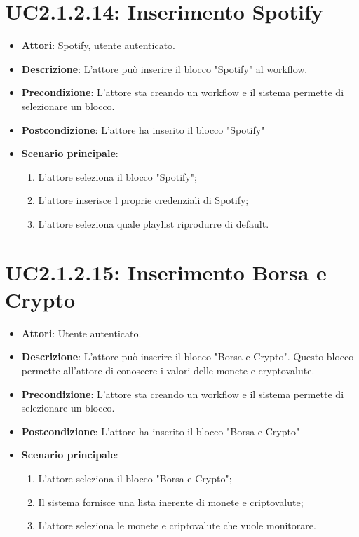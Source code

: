 \section{UC2.1.2.14: Inserimento Spotify}
\label{UC2.1.2.14}
\begin{itemize}
	\item \textbf{Attori}: Spotify, utente autenticato.
	\item \textbf{Descrizione}: L'attore può inserire il blocco "Spotify" al workflow.
	\item \textbf{Precondizione}: L'attore sta creando un workflow e il sistema permette di selezionare un blocco.
	\item \textbf{Postcondizione}: L'attore ha inserito il blocco "Spotify"
	\item \textbf{Scenario principale}:
	\begin{enumerate} \item L'attore seleziona il blocco "Spotify";  \item  L'attore inserisce l proprie credenziali di Spotify;  \item  L'attore seleziona quale playlist riprodurre di default.\end{enumerate}
\end{itemize}

\section{UC2.1.2.15: Inserimento Borsa e Crypto}
\label{UC2.1.2.15}
\begin{itemize}
	\item \textbf{Attori}: Utente autenticato.
	\item \textbf{Descrizione}: L'attore può inserire il blocco "Borsa e Crypto". Questo blocco permette all'attore di conoscere i valori delle monete e cryptovalute. 
	\item \textbf{Precondizione}: L'attore sta creando un workflow e il sistema permette di selezionare un blocco.
	\item \textbf{Postcondizione}: L'attore ha inserito il blocco "Borsa e Crypto"
	\item \textbf{Scenario principale}:
	\begin{enumerate} \item L'attore seleziona il blocco "Borsa e Crypto";  \item  Il sistema fornisce una lista inerente di monete e criptovalute;  \item  L'attore seleziona le monete e criptovalute che vuole monitorare.\end{enumerate}
\end{itemize}

